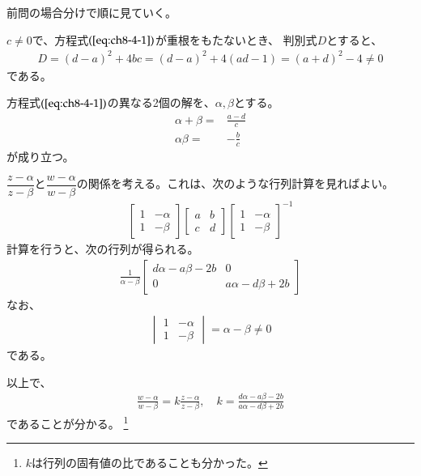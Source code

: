 前問の場合分けで順に見ていく。

$c\neq0$で、方程式$(\ref{eq:ch8-4-1})$が重根をもたないとき、
判別式$D$とすると、
\begin{align*}
    D=(d-a)^2+4bc
    =(d-a)^2+4(ad-1)
    =(a+d)^2-4\neq0
\end{align*}
である。

方程式$(\ref{eq:ch8-4-1})$の異なる2個の解を、$\alpha,\beta$とする。
\begin{align*}
    \alpha+\beta=&\frac{a-d}{c}\\
    \alpha\beta=&-\frac{b}{c}
\end{align*}
が成り立つ。

$\dfrac{z-\alpha}{z-\beta}$と$\dfrac{w-\alpha}{w-\beta}$の関係を考える。これは、次のような行列計算を見ればよい。
\begin{align*}
    \begin{bmatrix}
        1&-\alpha\\
        1&-\beta
    \end{bmatrix}
    \begin{bmatrix}
        a&b\\
        c&d
    \end{bmatrix}
    \begin{bmatrix}
        1&-\alpha\\
        1&-\beta
    \end{bmatrix}^{-1}
\end{align*}
計算を行うと、次の行列が得られる。
\begin{align*}
    \frac{1}{\alpha-\beta}
    \begin{bmatrix}
        d\alpha-a\beta-2b&0\\
        0&a\alpha-d\beta+2b
    \end{bmatrix}
\end{align*}
なお、
\begin{align*}
    \begin{vmatrix}
        1&-\alpha\\
        1&-\beta
    \end{vmatrix}
    =\alpha-\beta\neq0
\end{align*}
である。

以上で、
\begin{align*}
    \frac{w-\alpha}{w-\beta}
    =k\frac{z-\alpha}{z-\beta},\quad
    k=\frac{d\alpha-a\beta-2b}{a\alpha-d\beta+2b}
\end{align*}
であることが分かる。
\footnote{$k$は行列の固有値の比であることも分かった。}

